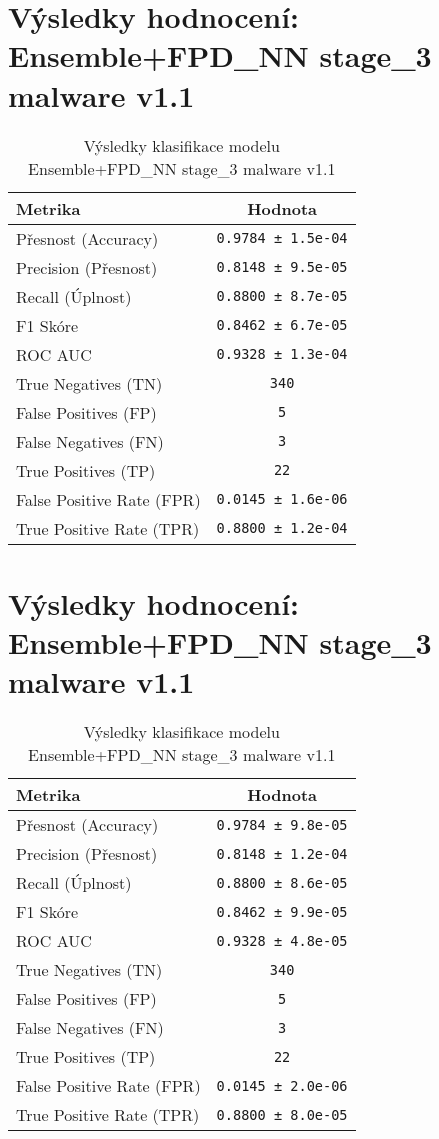 \section*{Výsledky hodnocení: Ensemble+FPD_NN stage_3 malware v1.1}
\begin{table}[h!]
\centering
\begin{tabular}{|l|c|}
\hline
\textbf{Metrika} & \textbf{Hodnota} \\
\hline
Přesnost (Accuracy) & \texttt{0.9784 ± 1.5e-04} \\
Precision (Přesnost) & \texttt{0.8148 ± 9.5e-05} \\
Recall (Úplnost) & \texttt{0.8800 ± 8.7e-05} \\
F1 Skóre & \texttt{0.8462 ± 6.7e-05} \\
ROC AUC & \texttt{0.9328 ± 1.3e-04} \\
True Negatives (TN) & \texttt{340} \\
False Positives (FP) & \texttt{5} \\
False Negatives (FN) & \texttt{3} \\
True Positives (TP) & \texttt{22} \\
False Positive Rate (FPR) & \texttt{0.0145 ± 1.6e-06} \\
True Positive Rate (TPR) & \texttt{0.8800 ± 1.2e-04} \\
\hline
\end{tabular}
\caption{Výsledky klasifikace modelu Ensemble+FPD_NN stage_3 malware v1.1}
\label{tab:malware_ensemble+fpd_nn}
\end{table}

\section*{Výsledky hodnocení: Ensemble+FPD_NN stage_3 malware v1.1}
\begin{table}[h!]
\centering
\begin{tabular}{|l|c|}
\hline
\textbf{Metrika} & \textbf{Hodnota} \\
\hline
Přesnost (Accuracy) & \texttt{0.9784 ± 9.8e-05} \\
Precision (Přesnost) & \texttt{0.8148 ± 1.2e-04} \\
Recall (Úplnost) & \texttt{0.8800 ± 8.6e-05} \\
F1 Skóre & \texttt{0.8462 ± 9.9e-05} \\
ROC AUC & \texttt{0.9328 ± 4.8e-05} \\
True Negatives (TN) & \texttt{340} \\
False Positives (FP) & \texttt{5} \\
False Negatives (FN) & \texttt{3} \\
True Positives (TP) & \texttt{22} \\
False Positive Rate (FPR) & \texttt{0.0145 ± 2.0e-06} \\
True Positive Rate (TPR) & \texttt{0.8800 ± 8.0e-05} \\
\hline
\end{tabular}
\caption{Výsledky klasifikace modelu Ensemble+FPD_NN stage_3 malware v1.1}
\label{tab:malware_ensemble+fpd_nn}
\end{table}

